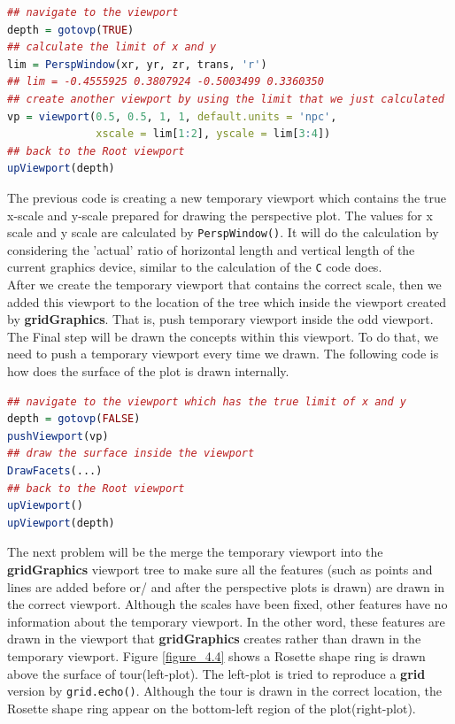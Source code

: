 \documentclass{report}
\begin{document}
\newpage
\begin{lstlisting}[language = R]
## navigate to the viewport
depth = gotovp(TRUE) 
## calculate the limit of x and y
lim = PerspWindow(xr, yr, zr, trans, 'r')
## lim = -0.4555925 0.3807924 -0.5003499 0.3360350
## create another viewport by using the limit that we just calculated
vp = viewport(0.5, 0.5, 1, 1, default.units = 'npc',
              xscale = lim[1:2], yscale = lim[3:4]) 
## back to the Root viewport
upViewport(depth)  
\end{lstlisting}
The previous code is creating a new temporary viewport which contains the true x-scale and y-scale prepared for drawing the perspective plot. The values for x scale and y scale are calculated by \texttt{PerspWindow()}. It will do the calculation by considering the 'actual' ratio of horizontal length and vertical length of the current graphics device, similar to the calculation of the \texttt{C} code does.\\
After we create the temporary viewport that contains the correct scale, then we added this viewport to the location of the tree which inside the viewport created by \textbf{gridGraphics}. That is, push temporary viewport inside the odd viewport. The Final step will be drawn the concepts within this viewport. To do that, we need to push a temporary viewport every time we drawn. The following code is how does the surface of the plot is drawn internally.

\begin{lstlisting}[language = R]
## navigate to the viewport which has the true limit of x and y
depth = gotovp(FALSE)
pushViewport(vp)
## draw the surface inside the viewport
DrawFacets(...)
## back to the Root viewport
upViewport()
upViewport(depth)
\end{lstlisting}

The next problem will be the merge the temporary viewport into the \textbf{gridGraphics} viewport tree to make sure all the features (such as points and lines are added before or/ and after the perspective plots is drawn) are drawn in the correct viewport. Although the scales have been fixed, other features have no information about the temporary viewport. In the other word, these features are drawn in the viewport that \textbf{gridGraphics} creates rather than drawn in the temporary viewport. Figure \ref{figure_4.4} shows a Rosette shape ring is drawn above the surface of tour(left-plot). The left-plot is tried to reproduce a \textbf{grid} version by \texttt{grid.echo()}. Although the tour is drawn in the correct location, the Rosette shape ring appear on the bottom-left region of the plot(right-plot).
\end{document}
